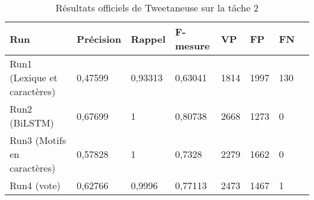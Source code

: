 

\begin{table}[htbp]
  \begin{center}
    \begin{tabular}{l|l|l|l|l|l|l|l}
Run		& Précision	& Rappel& F-mesure	& VP 	&FP 	&FN\\
\hline
\hline
Run1 (Lexique et caractères)   	&0,47599 	&0,93313 	&0,63041	&1814	&1997	&130\\
Run2 (BiLSTM) 	&0,67699	&1		&0,80738	&2668	&1273	&0\\
Run3 (Motifs en caractères) 	&0,57828&1  		&0,7328 	&2279	&1662	&0\\
Run4 (vote) 	&0,62766  	&0,9996  	&0,77113 	&2473	&1467	&1\\
\hline


\end{tabular}
\caption{Résultats officiels de Tweetaneuse sur la tâche 2\label{tab:resultats_T2}}
\end{center}
\end{table}
